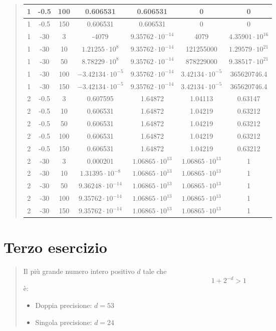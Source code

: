 \documentclass[10pt]{article}
\begin{document}
\begin{quote}
\begin{tabular}{| c | c | c | c | c | c | c |}
        1 & -0.5 & 100 & 0.606531 & 0.606531 & 0 & 0 \\
        \hline
        1 & -0.5 & 150 & 0.606531 & 0.606531 & 0 & 0 \\
        \hline
        1 & -30 & 3 & -4079 & $9.35762\cdot10^{-14}$ & 4079 & $4.35901\cdot10^{16}$ \\
        \hline
        1 & -30 & 10 & $1.21255\cdot10^{8}$ & $9.35762\cdot10^{-14}$ & 121255000 & $1.29579\cdot10^{21}$ \\
        \hline
        1 & -30 & 50 & $8.78229\cdot10^{8}$ & $9.35762\cdot10^{-14}$ & 878229000 & $9.38517\cdot10^{21}$ \\
        \hline
        1 & -30 & 100 & $-3.42134\cdot10^{-5}$ & $9.35762\cdot10^{-14}$ & $3.42134\cdot10^{-5}$ & 365620746.4\\
        \hline
        1 & -30 & 150 & $-3.42134\cdot10^{-5}$ & $9.35762\cdot10^{-14}$ & $3.42134\cdot10^{-5}$ & 365620746.4 \\
        \hline
        2 & -0.5 & 3 & 0.607595 & 1.64872 & 1.04113 & 0.63147 \\
        \hline
        2 & -0.5 & 10 & 0.606531 & 1.64872 & 1.04219 & 0.63212 \\
        \hline
        2 & -0.5 & 50 & 0.606531 & 1.64872 & 1.04219 & 0.63212 \\
        \hline
        2 & -0.5 & 100 & 0.606531 & 1.64872 & 1.04219 & 0.63212 \\
        \hline
        2 & -0.5 & 150 & 0.606531 & 1.64872 & 1.04219 & 0.63212 \\
        \hline
        2 & -30 & 3 & 0.000201 & $1.06865\cdot10^{13}$ & $1.06865\cdot10^{13}$ & 1 \\
        \hline
        2 & -30 & 10 & $1.31395\cdot10^{-8}$ & $1.06865\cdot10^{13}$ & $1.06865\cdot10^{13}$ & 1 \\
        \hline
        2 & -30 & 50 & $9.36248\cdot10^{-14}$ & $1.06865\cdot10^{13}$ & $1.06865\cdot10^{13}$ & 1 \\
        \hline
        2 & -30 & 100 & $9.35762\cdot10^{-14}$ & $1.06865\cdot10^{13}$ & $1.06865\cdot10^{13}$ & 1 \\
        \hline
        2 & -30 & 150 & $9.35762\cdot10^{-14}$ & $1.06865\cdot10^{13}$ & $1.06865\cdot10^{13}$ & 1 \\
        \hline
    \end{tabular}
\end{quote}
\newpage
\section{Terzo esercizio}
\begin{quote}
    Il più grande numero intero positivo $d$ tale che \begin{equation*}
        1+2^{-d} > 1
    \end{equation*}
    è:
    \begin{itemize}
        \item Doppia precisione: $d=53$
        \item Singola precisione: $d=24$
    \end{itemize}
\end{quote}
\end{document}
